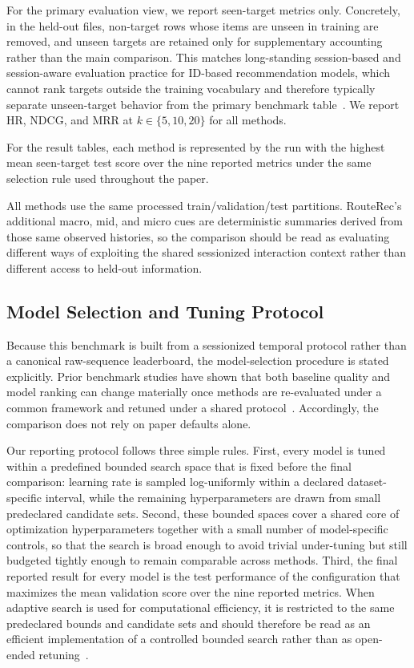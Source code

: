 \documentclass[sigconf,review,anonymous]{acmart}
\begin{document}
For the primary evaluation view, we report seen-target metrics only. Concretely, in the held-out files, non-target rows whose items are unseen in training are removed, and unseen targets are retained only for supplementary accounting rather than the main comparison. This matches long-standing session-based and session-aware evaluation practice for ID-based recommendation models, which cannot rank targets outside the training vocabulary and therefore typically separate unseen-target behavior from the primary benchmark table~\cite{latifi2021sessionaware,li2017narm,wu2019srgnn}. We report HR, NDCG, and MRR at $k\in\{5,10,20\}$ for all methods.

For the result tables, each method is represented by the run with the highest mean seen-target test score over the nine reported metrics under the same selection rule used throughout the paper.

All methods use the same processed train/validation/test partitions. RouteRec's additional macro, mid, and micro cues are deterministic summaries derived from those same observed histories, so the comparison should be read as evaluating different ways of exploiting the shared sessionized interaction context rather than different access to held-out information.

\subsection{Model Selection and Tuning Protocol}

Because this benchmark is built from a sessionized temporal protocol rather than a canonical raw-sequence leaderboard, the model-selection procedure is stated explicitly. Prior benchmark studies have shown that both baseline quality and model ranking can change materially once methods are re-evaluated under a common framework and retuned under a shared protocol~\cite{latifi2021sessionaware,latifi2022seqstudy}. Accordingly, the comparison does not rely on paper defaults alone.

Our reporting protocol follows three simple rules. First, every model is tuned within a predefined bounded search space that is fixed before the final comparison: learning rate is sampled log-uniformly within a declared dataset-specific interval, while the remaining hyperparameters are drawn from small predeclared candidate sets. Second, these bounded spaces cover a shared core of optimization hyperparameters together with a small number of model-specific controls, so that the search is broad enough to avoid trivial under-tuning but still budgeted tightly enough to remain comparable across methods. Third, the final reported result for every model is the test performance of the configuration that maximizes the mean validation score over the nine reported metrics. When adaptive search is used for computational efficiency, it is restricted to the same predeclared bounds and candidate sets and should therefore be read as an efficient implementation of a controlled bounded search rather than as open-ended retuning~\cite{galuzzi2020bayesopt}.
\end{document}
